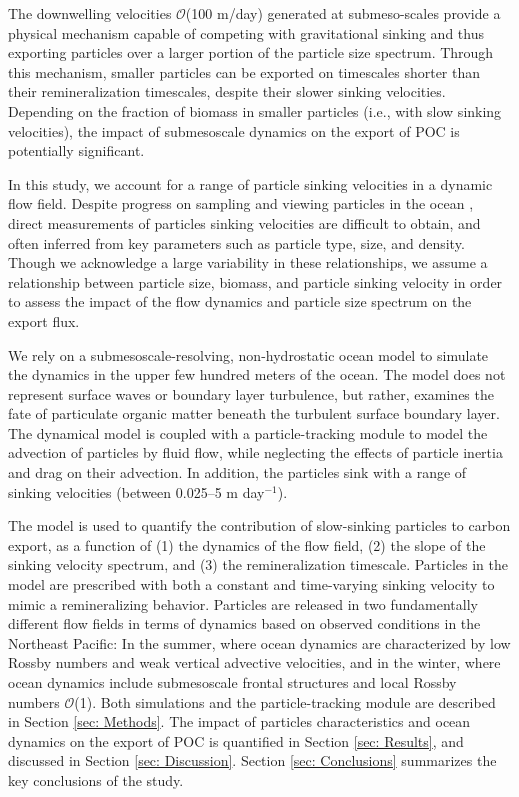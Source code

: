 \documentclass[article,linenumbers]{agujournal2018}
\begin{document}
The downwelling velocities $\mathcal{O}$(100 m/day) generated at submeso-scales provide a physical mechanism capable of competing with gravitational sinking and thus exporting particles over a larger portion of the particle size spectrum. Through this mechanism, smaller particles can be exported on timescales shorter than their remineralization timescales, despite their slower sinking velocities.   Depending on the fraction of  biomass in smaller particles (i.e., with slow sinking velocities), the impact of submesoscale dynamics on the export of POC is potentially significant.

In this study, we account for a range of particle sinking velocities in a dynamic flow field. Despite progress on sampling and viewing particles in the ocean \citep{McDonnell_2010}, direct measurements of particles sinking velocities are difficult to obtain, and often inferred from key parameters such as particle type, size, and density. Though we acknowledge a large variability in these relationships, we assume a relationship between particle size, biomass, and particle sinking velocity in order to assess the impact of the flow dynamics and particle size spectrum on the export flux. 

We  rely on a submesoscale-resolving, non-hydrostatic ocean model to simulate the dynamics in the upper few hundred meters of the ocean. The model does not represent surface waves or boundary layer turbulence, but rather, examines the fate of particulate organic matter beneath the turbulent surface boundary layer.
The dynamical model is coupled with a particle-tracking module to model the advection of particles by fluid flow, while neglecting the effects of particle inertia and drag on their advection. In addition, the particles sink with a range of sinking velocities (between 0.025--5 m day$^{-1}$).   

The model is used to quantify the contribution of slow-sinking particles to carbon export, as a function of (1) the dynamics of the flow field, (2) the slope of the sinking velocity spectrum, and (3) the remineralization timescale. Particles in the model are prescribed with both a constant and time-varying sinking velocity to mimic a remineralizing behavior. Particles are released in two fundamentally different flow fields in terms of dynamics based on observed conditions in the Northeast Pacific: In the summer, where ocean dynamics are characterized by low Rossby numbers and weak vertical advective velocities, and in the winter, where ocean dynamics include submesoscale frontal structures and local Rossby numbers $\mathcal{O}$(1). Both simulations and the particle-tracking module are described in Section \ref{sec: Methods}. The impact of particles characteristics and ocean dynamics on the export of POC is quantified in Section \ref{sec: Results}, and discussed in Section \ref{sec: Discussion}. Section \ref{sec: Conclusions} summarizes the key conclusions of the study.
\end{document}
